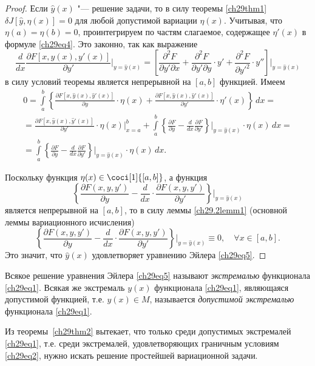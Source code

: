 \begin{proof}
Если $\hat{y}(x)$ "--- решение задачи, то в силу теоремы \ref{ch29thm1} $\delta J[\hat{y},\eta(x)] = 0$ для любой допустимой вариации $\eta(x)$. Учитывая, что $\eta(a)=\eta(b)=0$, проинтегрируем по частям слагаемое, содержащее $\eta'(x)$ в формуле \eqref{ch29eq4}. Это законно, так как выражение
$$
\frac{d}{dx}\frac{\partial F[x,y(x),y'(x)]}{\partial y'}\biggr|_{y=\hat{y}(x)} = \left[\frac{\partial^2F}{\partial y'\partial x}+\frac{\partial^2F}{\partial y'\partial y}\cdot y'+\frac{\partial ^2F}{\partial {y'}^{2}}\cdot y'' \right]\biggr|_{y=\hat{y}(x)}
$$
в силу условий теоремы является непрерывной на $[a,b]$ функцией. Имеем
\begin{multline*}
0=\int\limits_a^b\left\{\frac{\partial F[x,\hat{y}(x),\hat{y}'(x)]}{\partial y}\cdot \eta(x)+\frac{\partial F [x,\hat{y}(x),\hat{y}'(x)]}{\partial y'}\cdot\eta'(x)\right\}\,dx=\\=\frac{\partial F[x,\hat{y}(x),\hat{y}'(x)]}{\partial y'}\cdot \eta(x)\biggr|_{x=a}^{b}+\int\limits_a^b\left\{\frac{\partial F}{\partial y} - \frac{d}{dx}\frac{\partial F}{\partial y'}\right\}\biggr|_{y=\hat{y}(x)}\cdot\eta(x)\,dx=\\=\int\limits_a^b\left\{\frac{\partial F}{\partial y}-\frac{d}{dx}\frac{\partial F}{\partial y'}\right\}\biggr|_{y=\hat{y}(x)}\cdot \eta(x)\,dx.
\end{multline*}

Поскольку функция  $\eta(x)\in\coci[1]{[a,b]}$, а функция
$$
\left\{\frac{\partial F(x,y,y')}{\partial y}-\frac{d}{dx}\cdot\frac{\partial F(x,y,y')}{\partial y'} \right\}\biggr|_{y=\hat{y}(x)}
$$
является непрерывной на $[a,b]$, то в силу леммы  \ref{ch29.2lemm1} (основной леммы вариационного исчисления)
$$
\left\{\frac{\partial F(x,y,y')}{\partial y} - \frac{d}{dx}\cdot\frac{\partial F(x,y,y')}{\partial y'}\right\}\biggr|_{y=\hat{y}(x)}\equiv 0,\quad \forall x\in [a,b].
$$
Это значит, что $\hat{y}(x)$ удовлетворяет уравнению Эйлера \eqref{ch29eq5}.
\end{proof}

\begin{defn}
Всякое решение уравнения Эйлера \eqref{ch29eq5} называют \textit{экстремалью} функционала \eqref{ch29eq1}. Всякая же экстремаль $y(x)$ функционала \eqref{ch29eq1}, являющаяся допустимой функцией, т.е. $y(x)\in M$, называется \textit{допустимой экстремалью} функционала \eqref{ch29eq1}.
\end{defn}

Из теоремы~\ref{ch29thm2} вытекает, что только среди допустимых экстремалей \eqref{ch29eq1}, т.е. среди экстремалей, удовлетворяющих граничным условиям \eqref{ch29eq2}, нужно искать решение простейшей вариационной задачи. 

